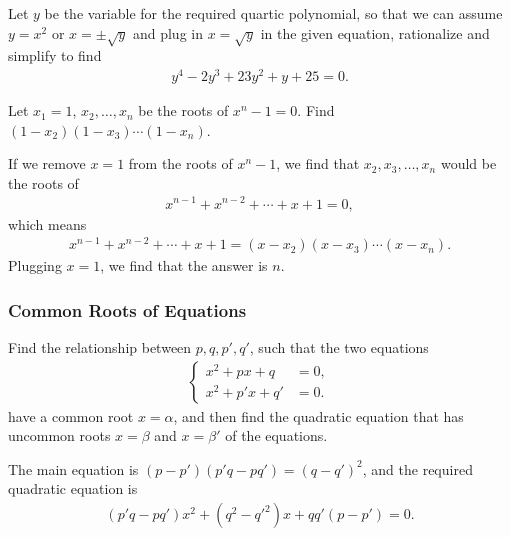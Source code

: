 \documentclass[12pt,a4paper]{memoir}
\theoremstyle{definition}
\begin{document}
\begin{solution}
	Let $y$ be the variable for the required quartic polynomial, so that we can assume $y=x^2$ or $x=\pm \sqrt{y}$ and plug in $x=\sqrt y$ in the given equation, rationalize and simplify to find
	\begin{align*}
		y^4 - 2y^3 + 23y^2 + y + 25 = 0.
	\end{align*}
\end{solution}


\begin{question}
	Let $x_1=1$, $x_2,\dots, x_n$ be the roots of $x^n-1=0$. Find $(1-x_2)(1-x_3)\cdots (1-x_n)$.
\end{question}

\begin{solution}
	If we remove $x=1$ from the roots of $x^n-1$, we find that $x_2,x_3,\dots,x_n$ would be the roots of 
	\begin{align*}
		x^{n-1} + x^{n-2} + \cdots + x+ 1 = 0,
	\end{align*}
	which means
	\begin{align*}
		x^{n-1} + x^{n-2} + \cdots + x+ 1 = (x-x_2)(x-x_3)\cdots (x-x_n).
	\end{align*}
	Plugging $x=1$, we find that the answer is $n$.
\end{solution}


\subsubsection{Common Roots of Equations}

\begin{question}
	Find the relationship between $p,q,p',q'$, such that the two equations
	\begin{align*}
		\begin{cases}
			x^2+px+q &= 0,\\x^2+p'x+q' &= 0.
		\end{cases}
	\end{align*}
	have a common root $x=\alpha$, and then find the quadratic equation that has uncommon roots $x=\beta$ and $x=\beta'$ of the equations.
\end{question}

\begin{solution}
	The main equation is $(p-p')(p'q-pq')=(q-q')^2$, and the required quadratic equation is
	\begin{align*}
		(p'q-pq')x^2+(q^2-q'^2)x+qq'(p-p')=0.
	\end{align*}
\end{solution}
\end{document}
